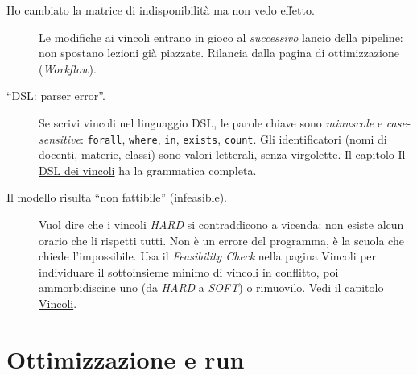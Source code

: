 \begin{description}

\item[Ho cambiato la matrice di indisponibilit\`a ma non vedo effetto.]
Le modifiche ai vincoli entrano in gioco al \emph{successivo}
lancio della pipeline: non spostano lezioni gi\`a piazzate.
Rilancia dalla pagina di ottimizzazione (\emph{Workflow}).

\item[``DSL: parser error''.]
Se scrivi vincoli nel linguaggio DSL, le parole chiave sono
\emph{minuscole} e \emph{case-sensitive}: \texttt{forall},
\texttt{where}, \texttt{in}, \texttt{exists}, \texttt{count}. Gli
identificatori (nomi di docenti, materie, classi) sono valori
letterali, senza virgolette. Il capitolo
\hyperref[part:dsl]{Il DSL dei vincoli} ha la grammatica completa.

\item[Il modello risulta ``non fattibile'' (infeasible).]
Vuol dire che i vincoli \emph{HARD} si contraddicono a vicenda:
non esiste alcun orario che li rispetti tutti. Non \`e un errore
del programma, \`e la scuola che chiede l'impossibile. Usa il
\emph{Feasibility Check} nella pagina Vincoli per individuare il
sottoinsieme minimo di vincoli in conflitto, poi ammorbidiscine
uno (da \emph{HARD} a \emph{SOFT}) o rimuovilo. Vedi il capitolo
\hyperref[ch:vincoli]{Vincoli}.

\end{description}

\section{Ottimizzazione e run}

